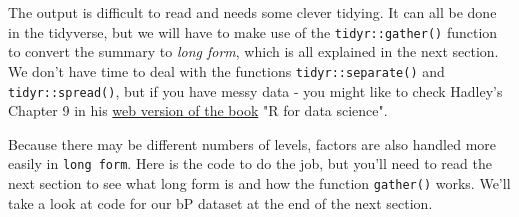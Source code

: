 \documentclass[titlepage]{book}\usepackage{knitr}
\begin{document}
\begin{knitrout}
\color{fgcolor}\begin{kframe}
\begin{alltt}
\hlstd{(}
               
              
                 
                
                
                
\end{alltt}
\end{kframe}
\end{knitrout}
The output is difficult to read and needs some clever tidying. It can all be done in the tidyverse, but we will have to make use of the \texttt{tidyr::gather()} function to convert the summary to \textsl{long form}, which is all explained in the next section. We don't have time to deal with the functions \texttt{tidyr::separate()} and \texttt{tidyr::spread()}, but if you have messy data - you might like to check Hadley's Chapter 9 in his \href{https://r4ds.had.co.nz/index.html}{web version of the book} "R for data science"\cite{Wickham2017}.
\begin{knitrout}
\color{fgcolor}
\end{knitrout}

Because there may be different numbers of levels, factors are also handled more easily in \texttt{long form}.  Here is the code to do the job, but you'll need to read the next section to see what long form is and how the function \texttt{gather()} works. We'll take a look at code for our bP dataset at the end of the next section.
\end{document}

